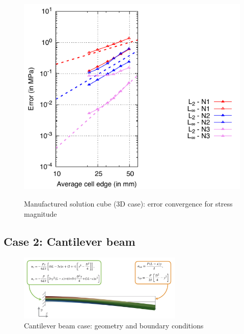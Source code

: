 \documentclass[sn-mathphys,Numbered]{sn-jnl}%
\begin{document}
\begin{figure}[H]
{    		\includegraphics[scale=0.8]{figures/mms/3D/mms_stressErrors_ho-poly}  
    }
 	\caption{Manufactured solution cube (3D case): error convergence for stress magnitude}
 	\label{fig:cell}
 \end{figure}

\subsection{Case 2: Cantilever beam}
%
\begin{figure}[H]
	\centering
	\includegraphics[width=0.7\textwidth]{figures/cantilever/cantilever.png} 
	\caption{Cantilever beam case: geometry and boundary conditions}
	\label{fig:cantilever}
\end{figure}
\end{document}
